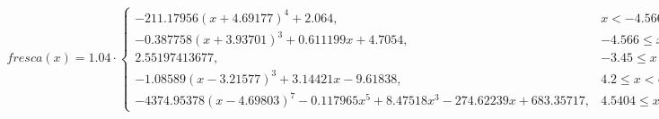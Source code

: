 \documentclass[preview]{standalone}
\begin{document}
\begin{align*}
fresca(x) = 1.04 \cdot \begin{cases}-211.17956(x + 4.69177)^4 + 2.064, & x < -4.566 \\-0.387758(x + 3.93701)^3 + 0.611199x + 4.7054, & -4.566 \leq x < -3.45 \\2.55197413677, & -3.45 \leq x < 4.2 \\-1.08589(x - 3.21577)^3 + 3.14421x - 9.61838, & 4.2 \leq x < 4.5404 \\-4374.95378(x - 4.69803)^7 - 0.117965x^5 + 8.47518x^3 - 274.62239x + 683.35717, & 4.5404 \leq x \leq 5\end{cases}
\end{align*}
\end{document}
